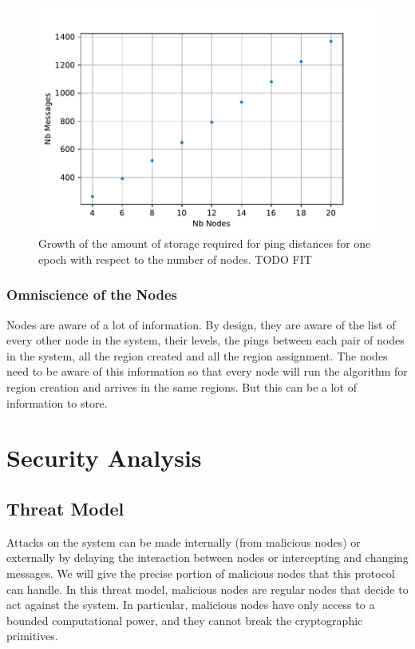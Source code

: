 \documentclass[a4paper,11pt,oneside]{report}
\begin{document}
\begin{figure}[!h] 
\centering
\includegraphics[width=350pt]{figures/storage-plot}
\caption{Growth of the amount of storage required for ping distances for one epoch with
  respect to the number of nodes. \color{red} TODO FIT \color{black} } \label{fig:storage-plot}
\end{figure}

 
\subsubsection{Omniscience of the Nodes}
Nodes are aware of a lot of information. By design, they are aware of
the list of every other node in the system, their levels, the pings between
each pair of nodes in the system, all the region created and all the region
assignment. The nodes need to be aware of this information so that
every node will run the algorithm for region creation and arrives in the same
regions. But this can be a lot of information to store.

\section{Security Analysis}

\subsection{Threat Model}
Attacks on the system can be made internally (from malicious nodes) or
externally by delaying the interaction between nodes or intercepting and
changing messages. We will give the precise portion of malicious nodes that
this protocol can handle. In this threat model, malicious nodes are regular
nodes that decide to act against the system. In particular, malicious nodes
have only access to a bounded computational power, and they cannot break the
cryptographic primitives. 
\end{document}
